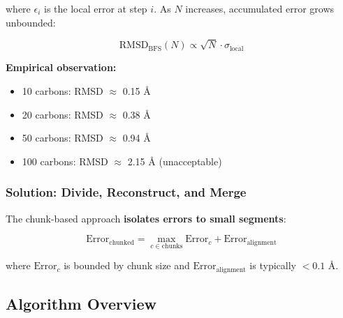 \documentclass[11pt,a4paper]{article}
\begin{document}
where $\epsilon_i$ is the local error at step $i$. As $N$ increases, accumulated error grows unbounded:

\begin{equation}
\text{RMSD}_{\text{BFS}}(N) \propto \sqrt{N} \cdot \sigma_{\text{local}}
\end{equation}

\textbf{Empirical observation:}
\begin{itemize}
    \item 10 carbons: RMSD $\approx$ 0.15 Å
    \item 20 carbons: RMSD $\approx$ 0.38 Å
    \item 50 carbons: RMSD $\approx$ 0.94 Å
    \item 100 carbons: RMSD $\approx$ 2.15 Å (unacceptable)
\end{itemize}

\subsubsection{Solution: Divide, Reconstruct, and Merge}

The chunk-based approach \textbf{isolates errors to small segments}:

\begin{equation}
\text{Error}_{\text{chunked}} = \max_{c \in \text{chunks}} \text{Error}_c + \text{Error}_{\text{alignment}}
\end{equation}

where $\text{Error}_c$ is bounded by chunk size and $\text{Error}_{\text{alignment}}$ is typically $< 0.1$ Å.

\subsection{Algorithm Overview}
\end{document}

